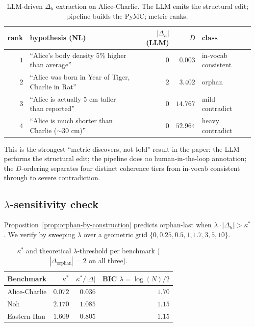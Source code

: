 \documentclass{article}
\begin{document}
\begin{table}[h]
\centering
\caption{LLM-driven $\Delta_{h}$ extraction on Alice-Charlie. The
LLM emits the structural edit; pipeline builds the PyMC; metric ranks.}
\label{tab:llmgen-delta}
\small
\begin{tabular}{rlrrl}
\toprule
rank & hypothesis (NL) & $|\Delta_{h}|$ (LLM) & $D$ & class \\
\midrule
$1$ & ``Alice's body density 5\% higher than average''  & $0$ & $0.003$ & in-vocab consistent \\
$2$ & ``Alice was born in Year of Tiger, Charlie in Rat'' & $2$ & $3.402$ & orphan \\
$3$ & ``Alice is actually 5 cm taller than reported''   & $0$ & $14.767$ & mild contradict \\
$4$ & ``Alice is much shorter than Charlie ($\sim$30 cm)'' & $0$ & $52.964$ & heavy contradict \\
\bottomrule
\end{tabular}
\end{table}

This is the strongest ``metric discovers, not told'' result in the
paper: the LLM performs the structural edit; the pipeline does no
human-in-the-loop annotation; the $D$-ordering separates four
distinct coherence tiers from in-vocab consistent through to severe
contradiction.

\subsection{$\lambda$-sensitivity check}
\label{sec:lambda-sens}

Proposition~\ref{prop:orphan-by-construction} predicts orphan-last
when $\lambda \cdot |\Delta_{h}| > \kappa^{*}$. We verify by
sweeping $\lambda$ over a geometric grid
$\{0, 0.25, 0.5, 1, 1.7, 3, 5, 10\}$.

\begin{table}[h]
\centering
\caption{$\kappa^{*}$ and theoretical $\lambda$-threshold per
benchmark ($|\Delta_{\mathrm{orphan}}| = 2$ on all three).}
\label{tab:kappa-star}
\small
\begin{tabular}{lrrr}
\toprule
Benchmark & $\kappa^{*}$ & $\kappa^{*}/|\Delta|$ & BIC $\lambda = \log(N)/2$ \\
\midrule
Alice-Charlie & $0.072$ & $0.036$ & $1.70$ \\
Noh           & $2.170$ & $1.085$ & $1.15$ \\
Eastern Han   & $1.609$ & $0.805$ & $1.15$ \\
\bottomrule
\end{tabular}
\end{table}
\end{document}

